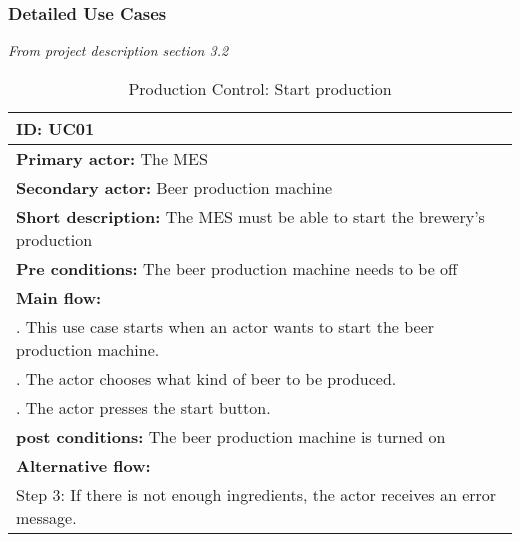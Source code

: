 \subsubsection{Detailed Use Cases}
\textit{From project description section 3.2}

\begin{table}[ht]
    \begin{tabularx}{\textwidth}{|>{\RaggedRight}X|}
        \hline
        \textbf{ID:} UC01  \\
        \hline
        \textbf{Primary actor:} The MES \\
        \hline
        \textbf{Secondary actor:} Beer production machine \\
        \hline
        \textbf{Short description:} The MES must be able to start the brewery's
        production \\
        \hline
        \textbf{Pre conditions:} The beer production machine needs to be off \\
        \hline
        \textbf{Main flow:} \\
        	1. This use case starts when an actor wants to start the beer
        	production machine. \\
        	2. The actor chooses what kind of beer to be produced. \\
        	3. The actor presses the start button. \\
		\hline
        \textbf{post conditions:} The beer production machine is turned on \\
        \hline
        \textbf{Alternative flow:} \\
        	Step 3: If there is not enough ingredients, the actor receives an
        	error message. \\
        \hline
    \end{tabularx}
    \caption{Production Control: Start production}
    \label{table:usecase_productionStart}
\end{table}

